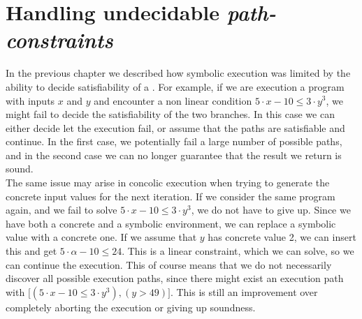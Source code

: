 \section{Handling undecidable \emph{path-constraints}} 
In the previous chapter we described how symbolic execution was limited by the ability to decide satisfiability of a \pc. For example, if we are execution a program with inputs $x$ and $y$ and encounter a non linear condition $ 5\cdot x - 10 \leq 3 \cdot y^3$, we might fail to decide the satisfiability of the two branches. In this case we can either decide let the execution fail, or assume that the paths are satisfiable and continue. In the first case, we potentially fail a large number of possible paths, and in the second case we can no longer guarantee that the result we return is sound.\\
The same issue may arise in concolic execution when trying to generate the concrete input values for the next iteration. If we consider the same program again, and we fail to solve $ 5\cdot x - 10 \leq 3 \cdot y^3$, we do not have to give up. Since we have both a concrete and a symbolic environment, we can replace a symbolic value with a concrete one. If we assume that $y$ has concrete value 2, we can insert this and get $ 5\cdot \alpha - 10 \leq 24$. This is a linear constraint, which we can solve, so we can continue the execution. This of course means that we do not necessarily discover all possible execution paths, since there might exist an execution path with \pc $\lbrack (5\cdot x - 10 \leq 3 \cdot y^3), (y > 49) \rbrack$. This is still an improvement over completely aborting the execution or giving up soundness. 
